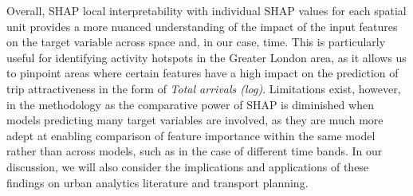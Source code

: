 Overall, SHAP local interpretability with individual SHAP values for each spatial unit provides a more nuanced understanding of the impact of the input features on the target variable across space and, in our case, time. This is particularly useful for identifying activity hotspots in the Greater London area, as it allows us to pinpoint areas where certain features have a high impact on the prediction of trip attractiveness in the form of \textit{Total arrivals (log)}. Limitations exist, however, in the methodology as the comparative power of SHAP is diminished when models predicting many target variables are involved, as they are much more adept at enabling comparison of feature importance within the same model rather than across models, such as in the case of different time bands. In our discussion, we will also consider the implications and applications of these findings on urban analytics literature and transport planning.